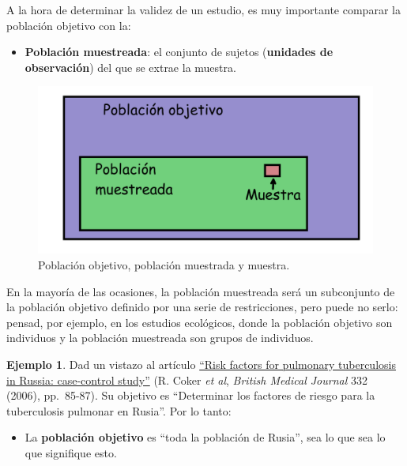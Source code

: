 \documentclass[
]{book}
\providecommand{\tightlist}{%
  \setlength{\itemsep}{0pt}\setlength{\parskip}{0pt}}
\theoremstyle{definition}
\theoremstyle{definition}
\newtheorem{example}{Ejemplo}[chapter]
\theoremstyle{definition}
\theoremstyle{definition}
\theoremstyle{remark}
\begin{document}
A la hora de determinar la validez de un estudio, es muy importante comparar la población objetivo con la:

\begin{itemize}
\tightlist
\item
  \textbf{Población muestreada}: el conjunto de sujetos (\textbf{unidades de observación}) del que se extrae la muestra.
\end{itemize}

\begin{figure}

{\centering \includegraphics[width=0.8\linewidth]{INREMDN_files/figure-html/muestra} 

}

\caption{Población objetivo, población muestrada y muestra.}\label{fig:muestra}
\end{figure}

En la mayoría de las ocasiones, la población muestreada será un subconjunto de la población objetivo definido por una serie de restricciones, pero puede no serlo: pensad, por ejemplo, en los estudios ecológicos, donde la población objetivo son individuos y la población muestreada son grupos de individuos.

\begin{example}
\protect\hypertarget{exm:tuberculosisrusia}{}\label{exm:tuberculosisrusia}Dad un vistazo al artículo \href{https://www.bmj.com/content/332/7533/85.short}{``Risk factors for pulmonary tuberculosis in Russia: case-control study''}
(R. Coker \emph{et al}, \emph{British Medical Journal} 332 (2006), pp.~85-87). Su objetivo es ``Determinar los factores de riesgo para la tuberculosis pulmonar en Rusia''. Por lo tanto:
\end{example}

\begin{itemize}
\tightlist
\item
  La \textbf{población objetivo} es ``toda la población de Rusia'', sea lo que sea lo que signifique esto.
\end{itemize}
\end{document}
